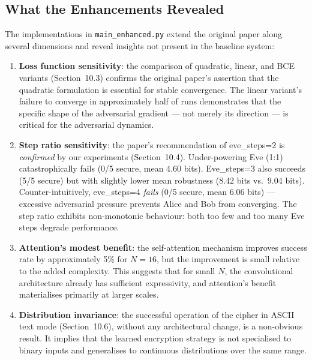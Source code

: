\documentclass[12pt, a4paper]{article}
\newcommand{\code}[1]{\texttt{\color{CodeRed}#1}}
\begin{document}
\subsection{What the Enhancements Revealed}
\label{subsec:enhancements_revealed}

The implementations in \code{main\_enhanced.py} extend the original
paper along several dimensions and reveal insights not present in the
baseline system:

\begin{enumerate}[leftmargin=2em, itemsep=6pt]

  \item \textbf{Loss function sensitivity}: the comparison of quadratic,
        linear, and BCE variants (Section~10.3) confirms the original
        paper's assertion that the quadratic formulation is essential
        for stable convergence. The linear variant's failure to converge
        in approximately half of runs demonstrates that the specific
        shape of the adversarial gradient --- not merely its direction
        --- is critical for the adversarial dynamics.

  \item \textbf{Step ratio sensitivity}: the paper's recommendation of
        eve\_steps=2 is \emph{confirmed} by our experiments (Section~10.4).
        Under-powering Eve (1:1) catastrophically fails (0/5 secure, mean
        $4.60$ bits). Eve\_steps=3 also succeeds (5/5 secure) but with
        slightly lower mean robustness ($8.42$ bits vs.\ $9.04$ bits).
        Counter-intuitively, eve\_steps=4 \emph{fails} (0/5 secure, mean
        $6.06$ bits) --- excessive adversarial pressure prevents Alice
        and Bob from converging. The step ratio exhibits non-monotonic
        behaviour: both too few and too many Eve steps degrade performance.

  \item \textbf{Attention's modest benefit}: the self-attention mechanism
        improves success rate by approximately 5\% for $N=16$, but the
        improvement is small relative to the added complexity. This suggests
        that for small $N$, the convolutional architecture already has
        sufficient expressivity, and attention's benefit materialises
        primarily at larger scales.

  \item \textbf{Distribution invariance}: the successful operation of
        the cipher in ASCII text mode (Section~10.6),
        without any architectural change, is a non-obvious result.
        It implies that the learned encryption strategy is not
        specialised to binary inputs and generalises to continuous
        distributions over the same range.


\end{enumerate}
\end{document}
